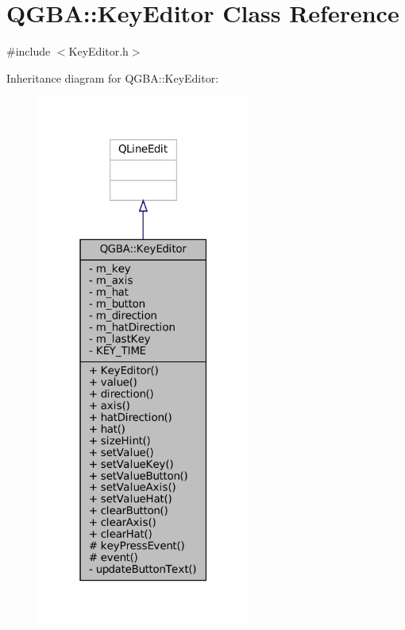 \hypertarget{class_q_g_b_a_1_1_key_editor}{}\section{Q\+G\+BA\+:\+:Key\+Editor Class Reference}
\label{class_q_g_b_a_1_1_key_editor}


{\ttfamily \#include $<$Key\+Editor.\+h$>$}



Inheritance diagram for Q\+G\+BA\+:\+:Key\+Editor\+:
\nopagebreak
\begin{figure}[H]
\begin{center}
\leavevmode
\includegraphics[width=199pt]{class_q_g_b_a_1_1_key_editor__inherit__graph}
\end{center}
\end{figure}


